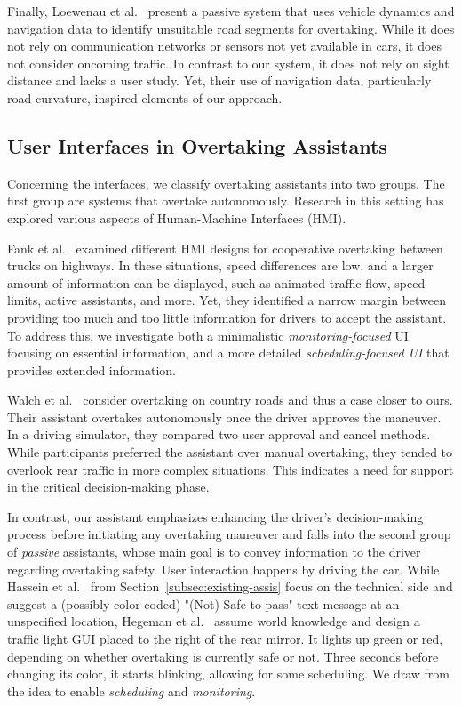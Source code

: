 Finally, Loewenau et al.~\cite{DynamicPassPrediction} present a passive system that uses vehicle dynamics and navigation data to identify unsuitable road segments for overtaking. 
While it does not rely on communication networks or sensors not yet available in cars, it does not consider oncoming traffic.
In contrast to our system, it does not rely on sight distance and lacks a user study. 
Yet, their use of navigation data, particularly road curvature, inspired elements of our approach.


\subsection{User Interfaces in Overtaking Assistants}\label{subsec:uis-in-existing-assistants}

Concerning the interfaces, we %
classify overtaking assistants into two groups. 
The first group are systems that overtake autonomously. 
Research in this setting has explored various aspects of Human-Machine Interfaces (HMI). 

Fank et al.~\cite{Frank2021} examined different HMI designs for cooperative overtaking between trucks on highways.
In these situations, speed differences are low, and a larger amount of information can be displayed, such as animated traffic flow, speed limits, active assistants, and more.
Yet, they identified a narrow margin between providing too much and too little information for drivers to accept the assistant. 
To address this, we investigate both a minimalistic \textit{monitoring-focused} UI focusing on essential information, and a more detailed \textit{scheduling-focused UI} that provides extended information.


Walch et al.~\cite{Walch2018,Walch2019} consider overtaking on country roads and thus a case closer to ours.
Their assistant overtakes autonomously once the driver approves the maneuver.
In a driving simulator, they compared two user approval and cancel methods. %
While participants preferred the assistant over manual overtaking, they tended to overlook rear traffic in more complex situations. 
This indicates a need for support in the critical decision-making phase. 


In contrast, our assistant emphasizes enhancing the driver's decision-making process before initiating any overtaking maneuver and falls into the second group of \textit{passive} assistants, whose 
main goal is to convey information to the driver regarding overtaking safety. 
User interaction happens by driving the car.
While Hassein et al.~\cite{Hassein2019} from Section~\ref{subsec:existing-assis} focus on the technical side and suggest a (possibly color-coded) "(Not) Safe to pass" text message at an unspecified location, Hegeman et al.~\cite{Hegeman2007} assume world knowledge and design a traffic light GUI placed to the right of the rear mirror. 
It lights up green or red, depending on whether overtaking is currently safe or not. 
Three seconds before changing its color, it starts blinking, allowing for some scheduling. 
We draw from the idea to enable \textit{scheduling} and \textit{monitoring}. 

